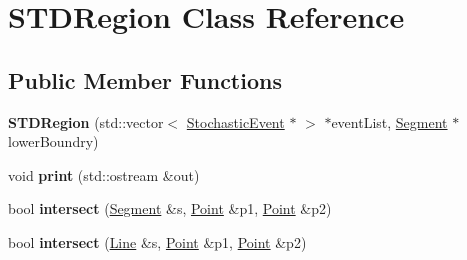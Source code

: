 \hypertarget{classSTDRegion}{\section{S\-T\-D\-Region Class Reference}
\label{classSTDRegion}
}
\subsection*{Public Member Functions}
\begin{DoxyCompactItemize}
\item 
\hypertarget{classSTDRegion_a52a3824cb008328519128c2511d3043e}{{\bfseries S\-T\-D\-Region} (std\-::vector$<$ \hyperlink{structStochasticEvent}{Stochastic\-Event} $\ast$ $>$ $\ast$event\-List, \hyperlink{classSegment}{Segment} $\ast$lower\-Boundry)}\label{classSTDRegion_a52a3824cb008328519128c2511d3043e}

\item 
\hypertarget{classSTDRegion_a23a481692098bea54e19f26f6551ab50}{void {\bfseries print} (std\-::ostream \&out)}\label{classSTDRegion_a23a481692098bea54e19f26f6551ab50}

\item 
\hypertarget{classSTDRegion_abb64369d5a5fa5b71231c827066111df}{bool {\bfseries intersect} (\hyperlink{classSegment}{Segment} \&s, \hyperlink{structPoint}{Point} \&p1, \hyperlink{structPoint}{Point} \&p2)}\label{classSTDRegion_abb64369d5a5fa5b71231c827066111df}

\item 
\hypertarget{classSTDRegion_ad45677a054f77585b7087be951630724}{bool {\bfseries intersect} (\hyperlink{classLine}{Line} \&s, \hyperlink{structPoint}{Point} \&p1, \hyperlink{structPoint}{Point} \&p2)}\label{classSTDRegion_ad45677a054f77585b7087be951630724}

\end{DoxyCompactItemize}

